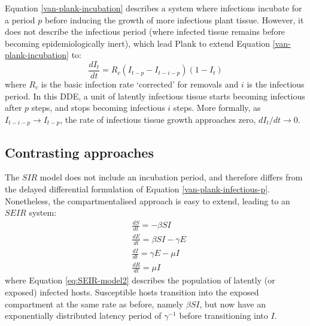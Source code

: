 Equation \ref{van-plank-incubation} describes a system where
infections incubate for a period $p$ before inducing the growth of more infectious plant tissue.
However, it does not describe the infectious period (where infected tissue remains before becoming epidemiologically inert),
which lead Plank to extend Equation \ref{van-plank-incubation} to:
\begin{equation}
\label{van-plank-infectious-p}
    \frac{dI_t}{dt} = R_c(I_{t-p} - I_{t-i-p})(1 - I_{t})
\end{equation}
where $R_c$ is the basic infection rate `corrected' for removals and $i$ is the infectious period.
In this DDE, a unit of latently infectious tissue starts becoming infectious after $p$ steps, and stops becoming infectious $i$ steps.
More formally, as $I_{t-i-p} \rightarrow I_{t-p}$, the rate of infectious tissue growth approaches zero, $dI_t/dt \rightarrow 0$.

\subsection{Contrasting approaches}
\label{sec:SIR-vs-plank}

The $SIR$ model does not include an incubation period, and therefore differs from the delayed differential formulation 
of Equation \ref{van-plank-infectious-p}. Nonetheless, the compartmentalised approach is easy to extend, leading to an 
$SEIR$ system:
\begin{align}
\label{eq:SEIR-model1}
    &\frac{dS}{dt} = -\beta SI \\
\label{eq:SEIR-model2}
    &\frac{dE}{dt} = \beta SI - \gamma E\\
    &\frac{dI}{dt} = \gamma E - \mu I \\
    \label{eq:SEIR-model3}
    &\frac{dR}{dt} = \mu I
\end{align}
where Equation \ref{eq:SEIR-model2} describes the population of latently (or exposed) infected hosts.
Susceptible hosts transition into the exposed compartment at the same rate as before, namely $\beta SI$, but now have an
exponentially distributed latency period of $\gamma^{-1}$ before transitioning into $I$.

